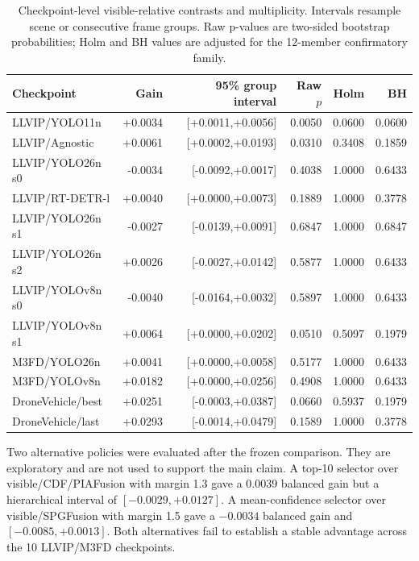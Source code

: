\documentclass[11pt]{article}
\begin{document}
\begin{table}[ht]
\centering
\scriptsize
\setlength{\tabcolsep}{3pt}
\caption{Checkpoint-level visible-relative contrasts and multiplicity.
Intervals resample scene or consecutive frame groups. Raw p-values are
two-sided bootstrap probabilities; Holm and BH values are adjusted for the
12-member confirmatory family.}
\begin{tabular}{@{}lrrrrr@{}}
\toprule
Checkpoint & Gain & 95\% group interval & Raw \(p\) & Holm & BH \\
\midrule
LLVIP/YOLO11n & +0.0034 & [+0.0011,+0.0056] & 0.0050 & 0.0600 & 0.0600 \\
LLVIP/Agnostic & +0.0061 & [+0.0002,+0.0193] & 0.0310 & 0.3408 & 0.1859 \\
LLVIP/YOLO26n s0 & -0.0034 & [-0.0092,+0.0017] & 0.4038 & 1.0000 & 0.6433 \\
LLVIP/RT-DETR-l & +0.0040 & [+0.0000,+0.0073] & 0.1889 & 1.0000 & 0.3778 \\
LLVIP/YOLO26n s1 & -0.0027 & [-0.0139,+0.0091] & 0.6847 & 1.0000 & 0.6847 \\
LLVIP/YOLO26n s2 & +0.0026 & [-0.0027,+0.0142] & 0.5877 & 1.0000 & 0.6433 \\
LLVIP/YOLOv8n s0 & -0.0040 & [-0.0164,+0.0032] & 0.5897 & 1.0000 & 0.6433 \\
LLVIP/YOLOv8n s1 & +0.0064 & [+0.0000,+0.0202] & 0.0510 & 0.5097 & 0.1979 \\
M3FD/YOLO26n & +0.0041 & [+0.0000,+0.0058] & 0.5177 & 1.0000 & 0.6433 \\
M3FD/YOLOv8n & +0.0182 & [+0.0000,+0.0256] & 0.4908 & 1.0000 & 0.6433 \\
DroneVehicle/best & +0.0251 & [-0.0003,+0.0387] & 0.0660 & 0.5937 & 0.1979 \\
DroneVehicle/last & +0.0293 & [-0.0014,+0.0479] & 0.1589 & 1.0000 & 0.3778 \\
\bottomrule
\end{tabular}
\end{table}

Two alternative policies were evaluated after the frozen comparison. They are
exploratory and are not used to support the main claim. A top-10 selector over
visible/CDF/PIAFusion with margin 1.3 gave a 0.0039 balanced gain but a
hierarchical interval of \([-0.0029,+0.0127]\). A mean-confidence selector over
visible/SPGFusion with margin 1.5 gave a \(-0.0034\) balanced gain and
\([-0.0085,+0.0013]\). Both alternatives fail to establish a stable advantage
across the 10 LLVIP/M3FD checkpoints.
\end{document}
